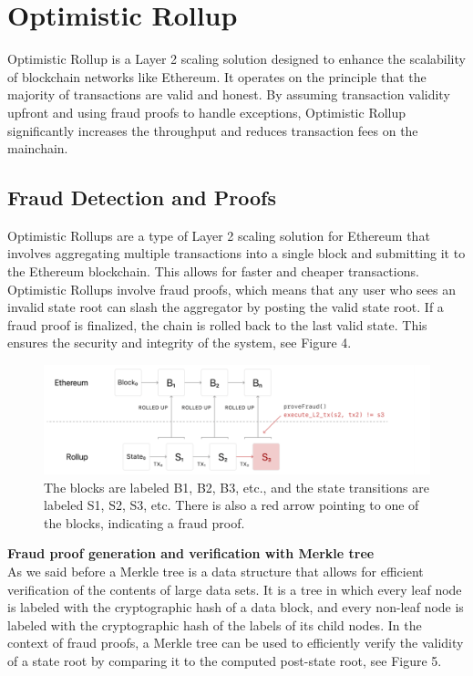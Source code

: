 \section{Optimistic Rollup}
Optimistic Rollup is a Layer 2 scaling solution designed to enhance the scalability of blockchain networks like Ethereum. It operates on the principle that the majority of transactions are valid and honest. By assuming transaction validity upfront and using fraud proofs to handle exceptions, Optimistic Rollup significantly increases the throughput and reduces transaction fees on the mainchain.
\subsection{Fraud Detection and Proofs}
Optimistic Rollups are a type of Layer 2 scaling solution for Ethereum that involves aggregating multiple transactions into a single block and submitting it to the Ethereum blockchain. This allows for faster and cheaper transactions.\\
Optimistic Rollups involve fraud proofs, which means that any user who sees an invalid state root can slash the aggregator by posting the valid state root. If a fraud proof is finalized, the chain is rolled back to the last valid state. This ensures the security and integrity of the system, see Figure 4.\\
\begin{center}
	\begin{figure}
		\centering
		\includegraphics[width=0.8\linewidth]{Fig/14/F4}
		\caption{The blocks are labeled B1, B2, B3, etc., and the state transitions are labeled S1, S2, S3, etc. There is also a red arrow pointing to one of the blocks, indicating a fraud proof.
		}
		\label{fig:f1}
	\end{figure}
\end{center}
\textbf{Fraud proof generation and verification with Merkle tree}\\ As we said before a Merkle tree is a data structure that allows for efficient verification of the contents of large data sets. It is a tree in which every leaf node is labeled with the cryptographic hash of a data block, and every non-leaf node is labeled with the cryptographic hash of the labels of its child nodes. In the context of fraud proofs, a Merkle tree can be used to efficiently verify the validity of a state root by comparing it to the computed post-state root, see Figure 5.
